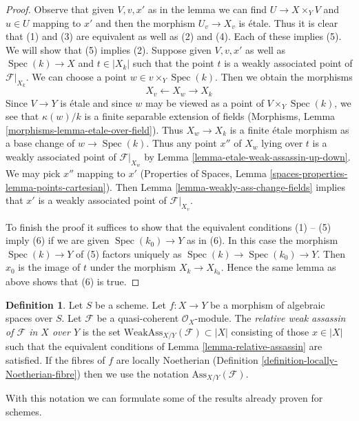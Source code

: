 \documentclass{stacks-project}
\theoremstyle{plain}
\theoremstyle{definition}
\newtheorem{definition}[subsection]{Definition}
\theoremstyle{remark}
\numberwithin{equation}{subsection}
\def\Spec{\mathop{\mathrm{Spec}}}
\begin{document}
\begin{proof}
Observe that given $V, v, x'$ as in the lemma we can find
$U \to X \times_Y V$ and $u \in U$ mapping to $x'$
and then the morphism $U_v \to X_v$ is \'etale.
Thus it is clear that (1) and (3) are equivalent
as well as (2) and (4). Each of these implies (5).
We will show that (5) implies (2).
Suppose given $V, v, x'$ as well as $\Spec(k) \to X$ and $t \in |X_k|$
such that the point $t$ is a weakly
associated point of $\mathcal{F}|_{X_k}$.
We can choose a point $w \in v \times_Y \Spec(k)$.
Then we obtain the morphisms
$$
X_v \longleftarrow X_w \longrightarrow X_k
$$
Since $V \to Y$ is \'etale and since $w$ may be viewed as a point of
$V \times_Y \Spec(k)$, we see that $\kappa(w)/k$
is a finite separable extension of fields
(Morphisms, Lemma \ref{morphisms-lemma-etale-over-field}).
Thus $X_w \to X_k$ is a finite \'etale morphism as a base change of
$w \to \Spec(k)$. Thus any point $x''$ of $X_w$ lying over $t$
is a weakly associated point of $\mathcal{F}|_{X_w}$ by
Lemma \ref{lemma-etale-weak-assassin-up-down}.
We may pick $x''$ mapping to $x'$
(Properties of Spaces, Lemma \ref{spaces-properties-lemma-points-cartesian}).
Then Lemma \ref{lemma-weakly-ass-change-fields}
implies that $x'$ is a weakly associated
point of $\mathcal{F}|_{X_v}$.

\medskip\noindent
To finish the proof it suffices to show that the equivalent
conditions (1) -- (5) imply (6) if we are given
$\Spec(k_0) \to Y$ as in (6). In this case the morphism
$\Spec(k) \to Y$ of (5) factors uniquely as $\Spec(k) \to \Spec(k_0) \to Y$.
Then $x_0$ is the image of $t$ under the morphism $X_k \to X_{k_0}$.
Hence the same lemma as above shows that (6) is true.
\end{proof}

\begin{definition}
\label{definition-relative-weak-assassin}
Let $S$ be a scheme. Let $f : X \to Y$ be a morphism of algebraic spaces
over $S$. Let $\mathcal{F}$ be a quasi-coherent $\mathcal{O}_X$-module.
The {\it relative weak assassin of $\mathcal{F}$ in $X$ over $Y$}
is the set $\text{WeakAss}_{X/Y}(\mathcal{F}) \subset |X|$
consisting of those $x \in |X|$ such that the equivalent conditions of
Lemma \ref{lemma-relative-assassin} are satisfied.
If the fibres of $f$ are locally Noetherian
(Definition \ref{definition-locally-Noetherian-fibre})
then we use the notation $\text{Ass}_{X/Y}(\mathcal{F})$.
\end{definition}

\noindent
With this notation we can formulate some of the results
already proven for schemes.
\end{document}
